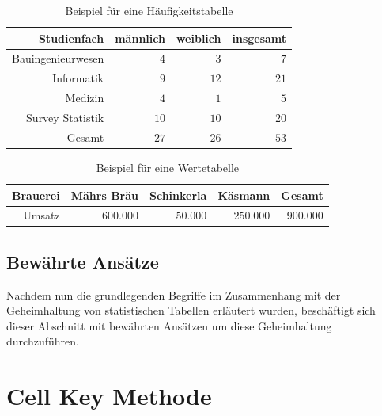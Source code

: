 \begin{table}[h]
    \centering
    \begin{tabular}{ r r r r }
        \textbf{Studienfach} \vline & \textbf{männlich} & \textbf{weiblich} & \textbf{insgesamt} \\ 
        \hline
        Bauingenieurwesen \vline & $4$ & $3$ & $7$ \\
        Informatik \vline & $9$ & $12$ & $21$ \\  
        Medizin \vline & $4$ & $1$ & $5$ \\
        Survey Statistik \vline & $10$ & $10$ & $20$ \\
        \hline
        Gesamt \vline & $27$ & $26$ & $53$
    \end{tabular}
    \caption{Beispiel für eine Häufigkeitstabelle}
\end{table}

\begin{table}[h]
    \centering
    \begin{tabular}{ r r r r r }
        \textbf{Brauerei} \vline & \textbf{Mährs Bräu} & \textbf{Schinkerla} & \textbf{Käsmann} & \textbf{Gesamt} \\ 
        \hline
        Umsatz \vline & $600.000$ & $50.000$ & $250.000$ & $900.000$
        \end{tabular}
    \caption{Beispiel für eine Wertetabelle}
\end{table}


\subsection{Bewährte Ansätze}

Nachdem nun die grundlegenden Begriffe im Zusammenhang mit der Geheimhaltung von statistischen Tabellen erläutert wurden, beschäftigt sich dieser Abschnitt mit bewährten Ansätzen um diese Geheimhaltung durchzuführen.





\section{Cell Key Methode}


